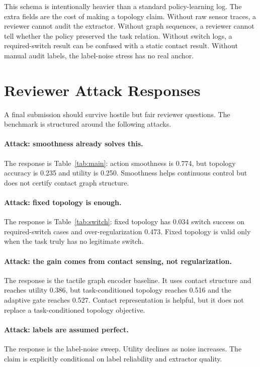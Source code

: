 \documentclass{article}
\begin{document}
This schema is intentionally heavier than a standard policy-learning log. The extra fields are the cost of making a topology claim. Without raw sensor traces, a reviewer cannot audit the extractor. Without graph sequences, a reviewer cannot tell whether the policy preserved the task relation. Without switch logs, a required-switch result can be confused with a static contact result. Without manual audit labels, the label-noise stress has no real anchor.

\section{Reviewer Attack Responses}

A final submission should survive hostile but fair reviewer questions. The benchmark is structured around the following attacks.

\paragraph{Attack: smoothness already solves this.}
The response is Table~\ref{tab:main}: action smoothness is 0.774, but topology accuracy is 0.235 and utility is 0.250. Smoothness helps continuous control but does not certify contact graph structure.

\paragraph{Attack: fixed topology is enough.}
The response is Table~\ref{tab:switch}: fixed topology has 0.034 switch success on required-switch cases and over-regularization 0.473. Fixed topology is valid only when the task truly has no legitimate switch.

\paragraph{Attack: the gain comes from contact sensing, not regularization.}
The response is the tactile graph encoder baseline. It uses contact structure and reaches utility 0.386, but task-conditioned topology reaches 0.516 and the adaptive gate reaches 0.527. Contact representation is helpful, but it does not replace a task-conditioned topology objective.

\paragraph{Attack: labels are assumed perfect.}
The response is the label-noise sweep. Utility declines as noise increases. The claim is explicitly conditional on label reliability and extractor quality.
\end{document}
